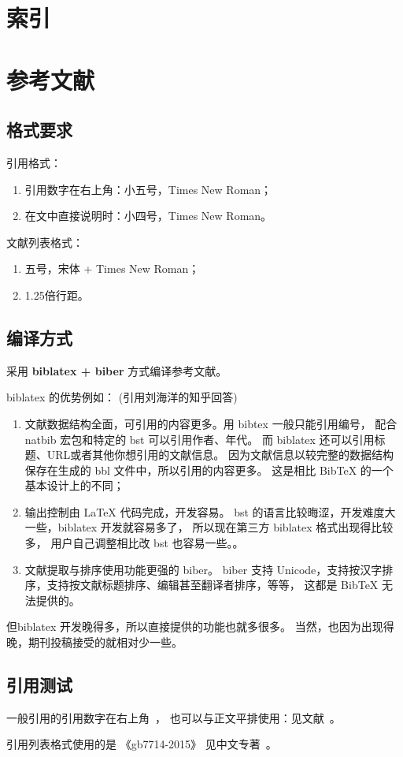 \section{索引}


\section{参考文献}

\subsection{格式要求}

引用格式：

\begin{enumerate}
	\item 引用数字在右上角：小五号，Times New Roman；
	\item 在文中直接说明时：小四号，Times New Roman。
\end{enumerate}

文献列表格式：

\begin{enumerate}
	\item 五号，宋体 + Times New Roman；
	\item 1.25倍行距。
\end{enumerate}

\subsection{编译方式}

采用 \textbf{biblatex + biber} 方式编译参考文献。

biblatex 的优势例如： (引用刘海洋的知乎回答)

\begin{enumerate}
	\item 文献数据结构全面，可引用的内容更多。用 bibtex 一般只能引用编号，
	      配合 natbib 宏包和特定的 bst 可以引用作者、年代。
	      而 biblatex 还可以引用标题、URL或者其他你想引用的文献信息。
	      因为文献信息以较完整的数据结构保存在生成的 bbl 文件中，所以引用的内容更多。
	      这是相比 BibTeX 的一个基本设计上的不同；
	\item 输出控制由 LaTeX 代码完成，开发容易。
	      bst 的语言比较晦涩，开发难度大一些，biblatex 开发就容易多了，
	      所以现在第三方 biblatex 格式出现得比较多，
	      用户自己调整相比改 bst 也容易一些。。
	\item 文献提取与排序使用功能更强的 biber。
	      biber 支持 Unicode，支持按汉字排序，支持按文献标题排序、编辑甚至翻译者排序，等等，
	      这都是 BibTeX 无法提供的。
\end{enumerate}

但biblatex 开发晚得多，所以直接提供的功能也就多很多。
当然，也因为出现得晚，期刊投稿接受的就相对少一些。

\subsection{引用测试}

一般引用的引用数字在右上角~\cite{knuth1984}，
也可以与正文平排使用：见文献~\parencite{knuth1986}。

引用列表格式使用的是 《gb7714-2015》
见中文专著~\cite{liu2013}。
